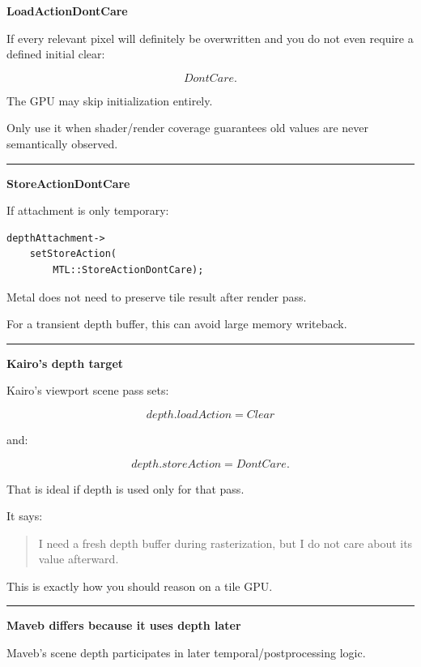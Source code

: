 \textbf{LoadActionDontCare}

If every relevant pixel will definitely be overwritten and you do not even require a defined initial clear:

\[
DontCare.
\]

The GPU may skip initialization entirely.

Only use it when shader/render coverage guarantees old values are never semantically observed.

\begin{center}\rule{0.5\linewidth}{0.5pt}\end{center}

\textbf{StoreActionDontCare}

If attachment is only temporary:

\begin{verbatim}
depthAttachment->
    setStoreAction(
        MTL::StoreActionDontCare);
\end{verbatim}

Metal does not need to preserve tile result after render pass.

For a transient depth buffer, this can avoid large memory writeback.

\begin{center}\rule{0.5\linewidth}{0.5pt}\end{center}

\textbf{Kairo's depth target}

Kairo's viewport scene pass sets:

\[
depth.loadAction=Clear
\]

and:

\[
depth.storeAction=DontCare.
\]

That is ideal if depth is used only for that pass.

It says:

\begin{quote}
I need a fresh depth buffer during rasterization, but I do not care about its value afterward.
\end{quote}

This is exactly how you should reason on a tile GPU.

\begin{center}\rule{0.5\linewidth}{0.5pt}\end{center}

\textbf{Maveb differs because it uses depth later}

Maveb's scene depth participates in later temporal/postprocessing logic.

